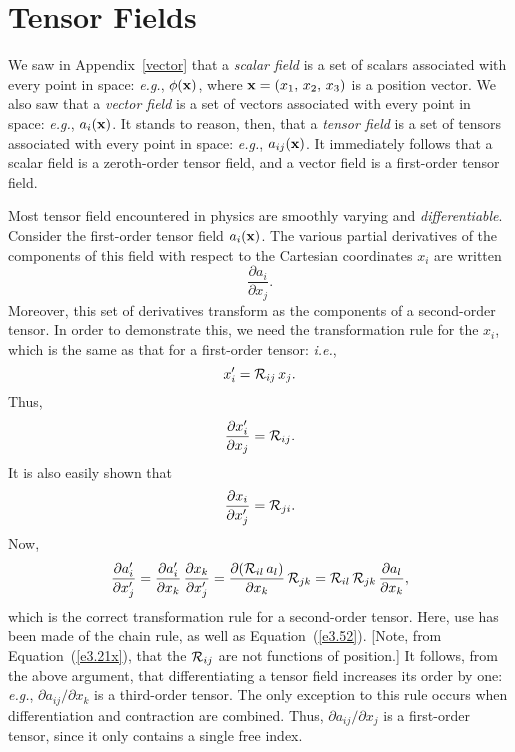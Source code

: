 \section{Tensor Fields}\label{stfield}
We saw in Appendix~\ref{vector} that  a {\em scalar field}\/ is a set of scalars  associated with every point in space: {\em e.g.},
$\phi({\bf x})$, where ${\bf x}= (x_1,\,x_2,\,x_3)$ is a position vector. We also saw that   a {\em vector field}\/
 is a set of vectors  associated with every point in space: {\em e.g.}, $a_i({\bf x})$. It stands to reason, then, that
a {\em tensor field}\/  is a set of tensors  associated with every point in space: {\em e.g.}, $a_{ij}({\bf x})$. 
It immediately follows that a scalar field is a zeroth-order tensor field, and a vector field is a first-order
tensor field.

Most tensor field encountered in physics are smoothly varying and {\em differentiable}. Consider the first-order tensor field $a_i({\bf x})$. 
The various partial derivatives of the components of this field with respect to the Cartesian coordinates $x_i$ are written
\begin{equation}
\frac{\partial a_i}{\partial x_j}.
\end{equation}
Moreover, this set of derivatives transform as the components of a  second-order tensor. In order to demonstrate this, we need the transformation
rule for the $x_i$, which is the same as that for a first-order tensor: {\em i.e.},
\begin{equation}
x_i' = {\cal R}_{ij}\,x_j.
\end{equation}
Thus,
\begin{equation}
\frac{\partial x_i'}{\partial x_j} = {\cal R}_{ij}.
\end{equation}
It is also easily shown that
\begin{equation}\label{e3.52}
\frac{\partial x_i}{\partial x_j'} = {\cal R}_{ji}.
\end{equation}
Now,
\begin{equation}
\frac{\partial a_i'}{\partial x_j'} = \frac{\partial a_i'}{\partial x_k}\,\frac{\partial x_k}{\partial x_j'}
= \frac{\partial ({\cal R}_{il}\,a_l)}{\partial x_k}\,{\cal R}_{jk}= {\cal R}_{il}\,{\cal R}_{jk}\,\frac{\partial a_l}{\partial x_k},
\end{equation}
which is the correct transformation rule for a second-order tensor. Here, use has been made of the chain rule, as
well as Equation~(\ref{e3.52}). [Note, from Equation~(\ref{e3.21x}), that the ${\cal R}_{ij}$ are not
functions of position.]
It follows, from the above argument, that differentiating a
tensor field increases its order by one: {\em e.g.}, $\partial a_{ij}/\partial x_k$ is a third-order tensor. The only
exception to this rule occurs when  differentiation and contraction are combined. Thus, $\partial a_{ij}/\partial x_j$
is a first-order tensor, since it only contains a single free index.  

